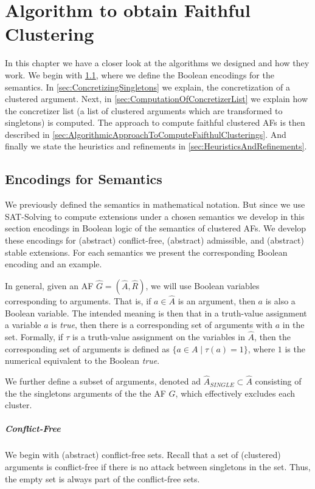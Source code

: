 \chapter{Algorithm to obtain Faithful Clustering}
In this chapter we have a closer look at the algorithms we designed and how they work.
We begin with \cref{sec:Encodings}, where we define the Boolean encodings for the semantics. In \cref{sec:ConcretizingSingletons} we explain, the concretization of a clustered argument. Next, in \cref{sec:ComputationOfConcretizerList} we explain how the concretizer list (a list of clustered arguments which are transformed to singletons) is computed. The approach to compute faithful clustered AFs is then described in \cref{sec:AlgorithmicApproachToComputeFaifthulClusterings}. And finally we state the heuristics and refinements in \cref{sec:HeuristicsAndRefinements}.


\section{Encodings for Semantics}
\label{sec:Encodings}
We previously defined the semantics in mathematical notation. But since we use SAT-Solving to compute extensions under a chosen semantics we develop in this section encodings in Boolean logic of the semantics of clustered AFs. We develop these encodings for (abstract) conflict-free, (abstract) admissible, and (abstract) stable extensions. For each semantics we present the corresponding Boolean encoding and an example.

In general, given an AF $\hat{G}=(\hat{A}, \hat{R})$, we will use Boolean variables corresponding to arguments. That is, if $a \in \hat{A}$ is an argument, then $a$ is also a Boolean variable. The intended meaning is then that in a truth-value assignment a variable $a$ is \emph{true}, then there is a corresponding set of arguments with $a$ in the set. Formally, if $\tau$ is a truth-value assignment on the variables in $\hat{A}$, then the corresponding set of arguments is defined as $\{a \in A \mid \tau(a) = 1\}$, where $1$ is the numerical equivalent to the Boolean \emph{true}.

We further define a subset of arguments, denoted ad $\hat{A}_{\!S\!I\!N\!G\!L\!E} \subset \hat{A}$ consisting of the the singletons arguments of the the AF $G$, which effectively excludes each cluster.


\paragraph{Conflict-Free} We begin with (abstract) conflict-free sets. Recall that a set of (clustered) arguments is conflict-free if there is no attack between singletons in the set. Thus, the empty set is always part of the conflict-free sets.

